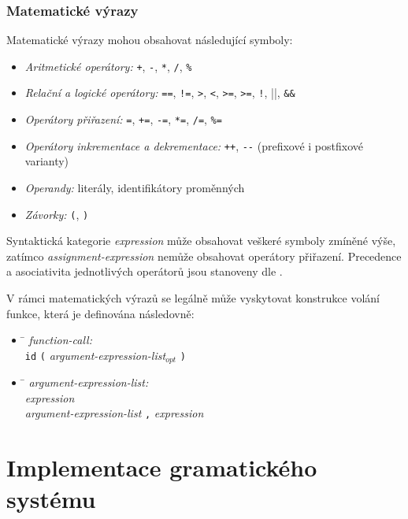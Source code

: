 \subsection*{Matematické výrazy}
Matematické výrazy mohou obsahovat následující symboly:
\begin{itemize}
  \item \emph{Aritmetické operátory:} \verb|+|, \verb|-|, \verb|*|, \verb|/|, \verb|%|
  \item \emph{Relační a logické operátory:} \verb|==|, \verb|!=|, \verb|>|, \verb|<|, \verb|>=|, \verb|>=|, \verb|!|, \verb||||, \verb|&&|
  \item \emph{Operátory přiřazení:} \verb|=|, \verb|+=|, \verb|-=|, \verb|*=|, \verb|/=|, \verb|%=|
  \item \emph{Operátory inkrementace a dekrementace:} \verb|++|, \verb|--| (prefixové i postfixové varianty)
  \item \emph{Operandy:} literály, identifikátory proměnných
  \item \emph{Závorky:} \verb|(|, \verb|)|
\end{itemize}

Syntaktická kategorie \emph{expression} může obsahovat veškeré symboly zmíněné výše, zatímco \emph{assignment-expression} nemůže obsahovat operátory přiřazení.
Precedence a asociativita jednotlivých operátorů jsou stanoveny dle \cite{cppreference:2012:OperatorPrecedence}.

V rámci matematických výrazů se legálně může vyskytovat konstrukce volání funkce, která je definována následovně:
\begin{itemize}
  \item \begin{tabbing}
    \qquad \qquad \= \kill
    \emph{function-call:}\\
    \> \verb|id| \verb|(| \emph{argument-expression-list$_{opt}$} \verb|)|
  \end{tabbing}
  \item \begin{tabbing}
    \qquad \qquad \= \kill
    \emph{argument-expression-list:}\\
    \> \emph{expression}\\
    \> \emph{argument-expression-list} \verb|,| \emph{expression}
  \end{tabbing}

\end{itemize}

\chapter{Implementace gramatického systému} \label{KapitolaImplementace}

